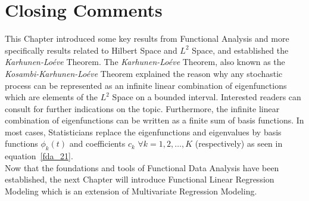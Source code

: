 
\section{Closing Comments}
This Chapter introduced some key results from Functional Analysis and more specifically results related to Hilbert Space and $L^2$ Space, and established the \textit{Karhunen-Lo\'{e}ve} Theorem. The \textit{Karhunen-Lo\'{e}ve} Theorem, also known as the \textit{Kosambi-Karhunen-Lo\'{e}ve} Theorem explained the reason why any stochastic process can be represented as an infinite linear combination of eigenfunctions which are elements of the $L^2$ Space on a bounded interval. Interested readers can consult \cite{Gohberg1990} for further indications on the topic. Furthermore, the infinite linear combination of eigenfunctions can be written as a finite sum of basis functions. In most cases, Statisticians replace the eigenfunctions and eigenvalues by basis functions $\phi_k(t)$ and coefficients $c_k$ $\forall k = 1,2,\dots,K$ (respectively) as seen in equation~\eqref{fda_21}.\\
Now that the foundations and tools of Functional Data Analysis have been established, the next Chapter will introduce Functional Linear Regression Modeling which is an extension of Multivariate Regression Modeling.